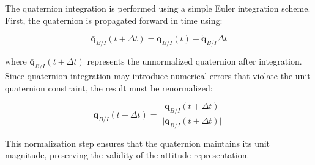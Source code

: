 The quaternion integration is performed using a simple Euler integration scheme. First, the quaternion is propagated forward in time using:

\begin{equation}
\bar{\mathbf{q}}_{B/I}(t + \Delta t) = \mathbf{q}_{B/I}(t) + \dot{\mathbf{q}}_{B/I}\Delta t
\end{equation}

\noindent where $\bar{\mathbf{q}}_{B/I}(t + \Delta t)$ represents the unnormalized quaternion after integration. Since quaternion integration
 may introduce numerical errors that violate the unit quaternion constraint, the result must be renormalized:

\begin{equation}
\mathbf{q}_{B/I}(t + \Delta t) = \frac{\bar{\mathbf{q}}_{B/I}(t + \Delta t)}{||\bar{\mathbf{q}}_{B/I}(t + \Delta t)||}
\end{equation}

\noindent This normalization step ensures that the quaternion maintains its unit magnitude, preserving the validity of the attitude representation.

\label{sec:modconclusion}
